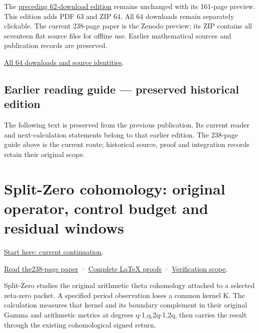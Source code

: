 \documentclass[
]{article}
\begin{document}
The \href{https://doi.org/10.5281/zenodo.22759785}{preceding 62-download
edition} remains unchanged with its 161-page preview. This edition adds
PDF 63 and ZIP 64. All 64 downloads remain separately clickable. The
current 238-page paper is the Zenodo preview; its ZIP contains all
seventeen flat source files for offline use. Earlier mathematical
sources and publication records are preserved.

\href{calculation_edition_20260915_operator_control/README.md}{All 64
downloads and source identities}.

\subsection{Earlier reading guide --- preserved historical
edition}\label{earlier-reading-guide-preserved-historical-edition-5}

The following text is preserved from the previous publication. Its
current reader and next-calculation statements belong to that earlier
edition. The 238-page guide above is the current route; historical
source, proof and integration records retain their original scope.

\section{Split-Zero cohomology: original operator, control budget and
residual
windows}\label{split-zero-cohomology-original-operator-control-budget-and-residual-windows-1}

\href{https://github.com/KokunoYumeto/zeta-function-research-reader/blob/main/workbenches/splitzero-tandem/continuations/20260915-operator-control-continuation/00_CONTINUE_HERE.md}{Start
here: current continuation}.

\href{https://github.com/KokunoYumeto/zeta-function-research-reader/blob/main/workbenches/splitzero-tandem/continuations/20260915-operator-control-continuation/15_CURRENT_MIXED_CONTROL_READER.pdf}{Read
the238-page paper} ·
\href{https://github.com/KokunoYumeto/zeta-function-research-reader/blob/main/workbenches/splitzero-tandem/continuations/20260915-operator-control-continuation/14_CURRENT_KERNEL_AND_MULTIPLICITY_PROOFS.tex}{Complete
LaTeX proofs} ·
\href{https://github.com/KokunoYumeto/zeta-function-research-reader/blob/main/workbenches/splitzero-tandem/continuations/20260915-operator-control-continuation/12_VALIDATION.md}{Verification
scope}.

Split-Zero studies the original arithmetic theta cohomology attached to
a selected zeta-zero packet. A specified period observation loses a
common kernel K. The calculation measures that kernel and its boundary
complement in their original Gamma and arithmetic metrics at degrees
q-1,q,2q-1,2q, then carries the result through the existing
cohomological signed return.
\end{document}
